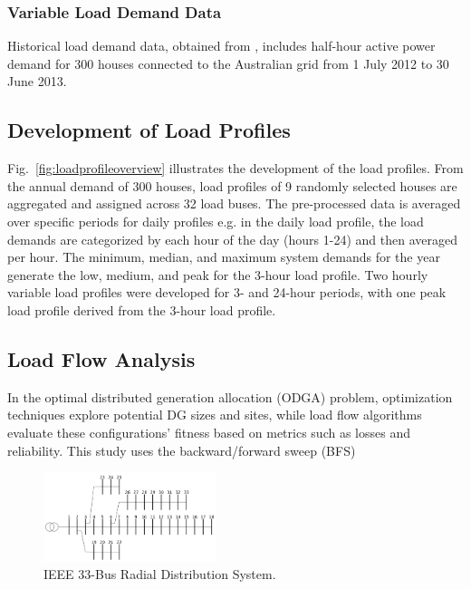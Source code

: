 \documentclass[conference]{IEEEtran}
\begin{document}

\subsubsection{Variable Load Demand Data}
Historical load demand data, obtained from \cite{Ausgrid_solar_2023}, includes half-hour active power demand for 300 houses connected to the Australian grid from 1 July 2012 to 30 June 2013.

\subsection{Development of Load Profiles}
Fig.~\ref{fig:loadprofileoverview} illustrates the development of the load profiles. From the annual demand of 300 houses, load profiles of 9 randomly selected houses are aggregated and assigned across 32 load buses. The pre-processed data is averaged over specific periods for daily profiles e.g. in the daily load profile, the load demands are categorized by each hour of the day (hours 1-24) and then averaged per hour. The minimum, median, and maximum system demands for the year generate the low, medium, and peak for the 3-hour load profile. Two hourly variable load profiles were developed for 3- and 24-hour periods, with one peak load profile derived from the 3-hour load profile.





\subsection{Load Flow Analysis}
In the optimal distributed generation allocation (ODGA) problem, optimization techniques explore potential DG sizes and sites, while load flow algorithms evaluate these configurations' fitness based on metrics such as losses and reliability. This study uses the backward/forward sweep (BFS) 

\begin{figure}[htbp]
	\centerline{\includegraphics[width=0.45\textwidth]{33bus.png}}
	\caption{IEEE 33-Bus Radial Distribution System.}
	\vspace{-5pt}
	\label{fig:33bus}
\end{figure}
\end{document}
